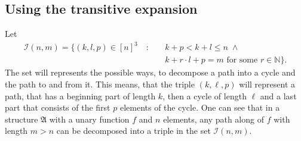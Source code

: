 \documentclass[a4paper,11pt,DIV=15]{scrartcl} %
\theoremstyle{plain}
\theoremstyle{definition}
\begin{document}
\subsection{Using the transitive expansion} 
Let 
\begin{align*}
\mathcal I(n,m)=\{(k,l,p)\in [n]^3 \quad:\quad & k+p < k+l \leq n \; \land \\
& k+r\cdot l + p = m \text{ for some } r\in \mathbb N\}.
\end{align*}
The set will represents the possible ways, to decompose a path into a cycle and the path to and from it.
This means, that the triple $(k,\ell,p)$ will represent a path, that has a beginning part of length $k$, then a cycle of length $\ell$ and a last part that consists of the first $p$ elements of the cycle.
One can see that in a structure $\mathfrak A$ with a unary function $f$ and $n$ elements, any path along of $f$ with length $m>n$ can be decomposed into a triple in the set $\mathcal I(n,m)$.
\end{document}
